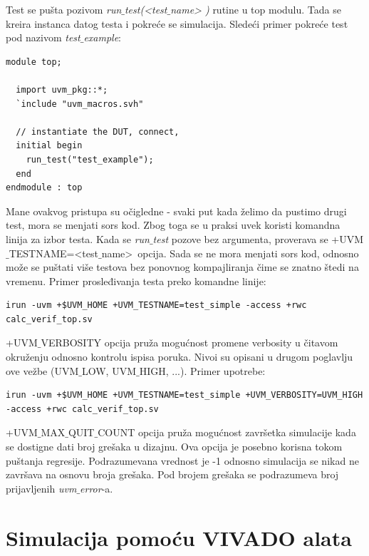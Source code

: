 Test se pušta pozivom \emph{run\(\_\)test(\textless test\(\_\)name\textgreater
  )} rutine u top modulu. Tada se kreira instanca datog testa i pokreće se
simulacija. Sledeći primer pokreće test pod nazivom \emph{test\(\_\)example}:

\begin{lstlisting}
module top;

  import uvm_pkg::*;
  `include "uvm_macros.svh"

  // instantiate the DUT, connect,
  initial begin
    run_test("test_example");
  end
endmodule : top
\end{lstlisting}

Mane ovakvog pristupa su očigledne - svaki put kada želimo da pustimo drugi
test, mora se menjati sors kod. Zbog toga se u praksi uvek koristi komandna
linija za izbor testa. Kada se \emph{run\(\_\)test} pozove bez argumenta,
proverava se +UVM\(\_\)TESTNAME=\textless test\(\_\)name\textgreater\ opcija.
Sada se ne mora menjati sors kod, odnosno može se puštati više testova bez
ponovnog kompajliranja čime se znatno štedi na vremenu. Primer prosleđivanja
testa preko komandne linije:

\begin{lstlisting}
irun -uvm +$UVM_HOME +UVM_TESTNAME=test_simple -access +rwc calc_verif_top.sv
\end{lstlisting}

+UVM\(\_\)VERBOSITY opcija pruža mogućnost promene verbosity u čitavom okruženju
odnosno kontrolu ispisa poruka. Nivoi su opisani u drugom poglavlju ove vežbe
(UVM\(\_\)LOW, UVM\(\_\)HIGH, ...). Primer upotrebe:

\begin{lstlisting}
irun -uvm +$UVM_HOME +UVM_TESTNAME=test_simple +UVM_VERBOSITY=UVM_HIGH -access +rwc calc_verif_top.sv
\end{lstlisting}

+UVM\(\_\)MAX\(\_\)QUIT\(\_\)COUNT opcija pruža mogućnost završetka simulacije
kada se dostigne dati broj grešaka u dizajnu. Ova opcija je posebno korisna
tokom puštanja regresije. Podrazumevana vrednost je -1 odnosno simulacija se
nikad ne završava na osnovu broja grešaka. Pod brojem grešaka se podrazumeva
broj prijavljenih \emph{uvm\(\_\)error}-a.

\section{Simulacija pomoću VIVADO alata}

